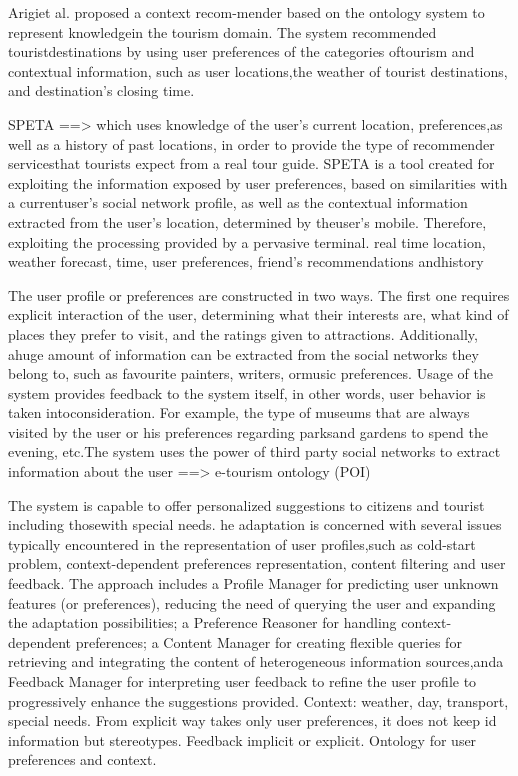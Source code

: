 Arigiet al. \cite{arigi2018context} proposed a context recom-mender based on the ontology system to represent knowledgein the tourism domain. The system recommended touristdestinations by using user preferences of the categories oftourism and contextual information, such as user locations,the weather of tourist destinations, and destination’s closing time.


\cite{garcia2009speta} SPETA ==> which uses knowledge of the user’s current location, preferences,as well as a history of past locations, in order to provide the type of recommender servicesthat tourists expect from a real tour guide. SPETA is a tool created for exploiting the information exposed by user preferences, based on similarities with a currentuser’s social network profile, as well as the contextual information extracted from the user’s location, determined by theuser’s mobile. Therefore, exploiting the processing provided by a pervasive terminal.
real time location, weather forecast, time, user preferences, friend’s recommendations andhistory

The user profile or preferences are constructed in two ways. The first one requires explicit interaction of the user, determining what their interests are, what kind of places they prefer to visit, and the ratings given to attractions. Additionally, ahuge amount of information can be extracted from the social networks they belong to, such as favourite painters, writers, ormusic preferences. Usage of the system provides feedback to the system itself, in other words, user behavior is taken intoconsideration. For example, the type of museums that are always visited by the user or his preferences regarding parksand gardens to spend the evening, etc.The system uses the power of third party social networks to extract information about the user ==> e-tourism ontology (POI)


\cite{alonso2012ontology}  The  system  is  capable  to offer personalized  suggestions to  citizens  and tourist including thosewith  special  needs. he  adaptation  is  concerned  with  several  issues typically  encountered  in  the  representation  of  user  profiles,such   as   cold-start   problem,   context-dependent   preferences representation,   content   filtering   and   user   feedback.   The approach   includes   a   Profile   Manager   for   predicting   user unknown   features   (or   preferences),   reducing   the   need   of querying the  user and expanding the  adaptation possibilities; a Preference Reasoner for handling context-dependent preferences; a Content Manager for creating flexible queries for retrieving and   integrating   the   content   of   heterogeneous information  sources,anda  Feedback  Manager  for interpreting user   feedback   to   refine   the   user   profile   to   progressively enhance the suggestions provided. Context: weather, day, transport, special needs. From explicit way takes only user preferences, it does not keep id information but stereotypes. Feedback implicit or explicit.
Ontology for user preferences and context.


